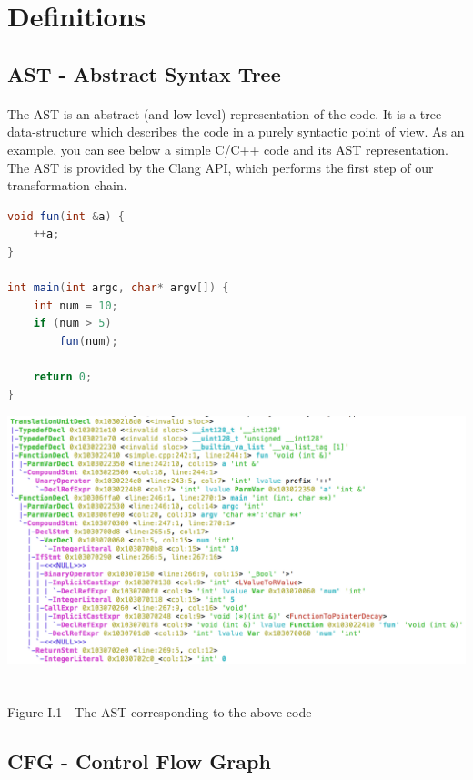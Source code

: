 \documentclass{report}
\begin{document}
\section{Definitions}

\subsection{AST - Abstract Syntax Tree}

\paragraph{}
\hspace{4mm}The AST is an abstract (and low-level) representation of the code. It is a tree data-structure which describes the code in a purely syntactic point of view. As an example,
you can see below a simple C/C++ code and its AST representation. The AST is provided by the Clang API, which performs the first step of our
transformation chain.

\begin{lstlisting}[language=java]
void fun(int &a) {
    ++a;
}

int main(int argc, char* argv[]) {
    int num = 10;
    if (num > 5)
        fun(num);
    
    return 0;
}
\end{lstlisting}
\begin{center}
\includegraphics[scale=0.6]{data/ast}
~\\~\\Figure I.1 - The AST corresponding to the above code
\end{center}

\subsection{CFG - Control Flow Graph}
\end{document}
